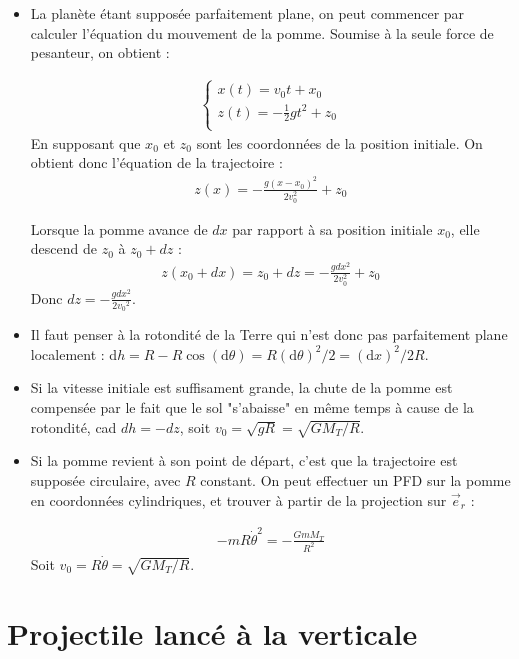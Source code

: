 \documentclass{report}
\begin{document}
\begin{itemize}
\item La planète étant supposée parfaitement plane, on peut commencer par calculer l'équation du mouvement de la pomme. Soumise à la seule force de pesanteur, on obtient :

\begin{align*}
	\left\lbrace
\begin{array}{ccc}
 x(t) =  v_0t+x_0 \\
 z(t) = -\frac{1}{2}gt^2+z_0 \\
\end{array}\right.
\end{align*}
En supposant que $x_0$ et $z_0$ sont les coordonnées de la position initiale. On obtient donc l'équation de la trajectoire :
\begin{align*}
	z(x) = -\frac{g(x-x_0)^2}{2v_0^2}+z_0
\end{align*}

Lorsque la pomme avance de $dx$ par rapport à sa position initiale $x_0$, elle descend de $z_0$ à $z_0+dz$ :
\begin{align*}
	z(x_0+dx)=z_0+dz=-\frac{gdx^2}{2v_0^2}+z_0
\end{align*}
Donc $dz=-\frac{gdx^2}{2{v_0}^2}$.

\item Il faut penser à la rotondité de la Terre qui n'est donc pas parfaitement plane localement : d$h=R-R\cos(\mathrm{d}\theta)=R(\mathrm{d}\theta)^2/2=(\mathrm{d}x)^2/2R$.

\item Si la vitesse initiale est suffisament grande, la chute de la pomme est compensée par le fait que le sol "s'abaisse" en même temps à cause de la rotondité, cad $dh=-dz$, soit $v_0=\sqrt{gR}=\sqrt{GM_T/R}$.

\item Si la pomme revient à son point de départ, c'est que la trajectoire est supposée circulaire, avec $R$ constant. On peut effectuer un PFD sur la pomme en coordonnées cylindriques, et trouver à partir de la projection sur $\vec{e}_r$ :

\begin{align*}
 -mR\dot{\theta}^2 =  -\frac{GmM_T}{R^2} 
\end{align*}
Soit $v_0=R\dot{\theta}=\sqrt{GM_T/R}$.
\end{itemize}

\newpage

\section*{Projectile lancé à la verticale}
\end{document}
